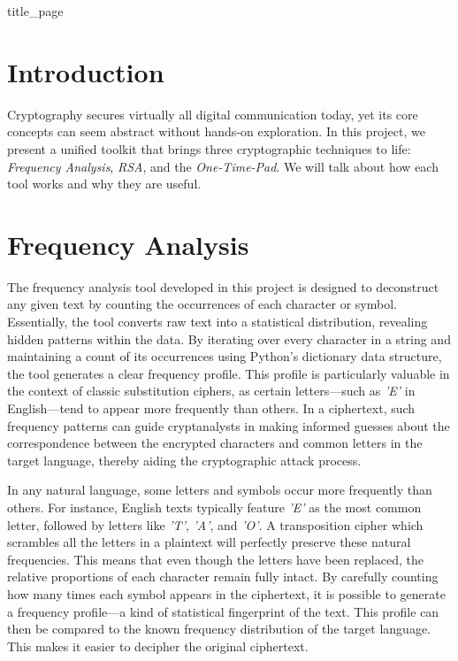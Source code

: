 \documentclass[11pt]{article}
\begin{document}
\raggedcolumns

{title_page}


\begin{multicols}{2}
	\begin{spacing}{1.125}
		\tableofcontents

		\section{Introduction}
		Cryptography secures virtually all digital communication today, yet its
		core concepts can seem abstract without hands‑on exploration. In this
		project, we present a unified toolkit that brings three cryptographic
		techniques to life: \textit{Frequency Analysis}, \textit{RSA}, and the
		\textit{One‑Time-Pad}. We will talk about how each tool works and why they
		are useful.


		\section{Frequency Analysis}
		The frequency analysis tool developed in this project is designed to
		deconstruct any given text by counting the occurrences of each character or
		symbol. Essentially, the tool converts raw text into a statistical
		distribution, revealing hidden patterns within the data. By iterating over
		every character in a string and maintaining a count of its occurrences
		using Python’s dictionary data structure, the tool generates a clear
		frequency profile. This profile is particularly valuable in the context of
		classic substitution ciphers, as certain letters—such as \textit{'E'} in
		English—tend to appear more frequently than others. In a ciphertext, such
		frequency patterns can guide cryptanalysts in making informed guesses about
		the correspondence between the encrypted characters and common letters in
		the target language, thereby aiding the cryptographic attack process.

		In any natural language, some letters and symbols occur more frequently
		than others. For instance, English texts typically feature \textit{'E'} as
		the most common letter, followed by letters like \textit{'T'},
		\textit{'A'}, and \textit{'O'}. A transposition cipher which scrambles
		all the letters in a plaintext will perfectly preserve these
		natural frequencies. This means that even though the letters have been
		replaced, the relative proportions of each character remain fully
		intact. By carefully counting how many times each symbol appears in the
		ciphertext, it is possible to generate a frequency profile—a kind of
		statistical fingerprint of the text. This profile can then be compared to
		the known frequency distribution of the target language. This makes it
		easier to decipher the original ciphertext.


\end{spacing}
\end{multicols}
\end{document}
